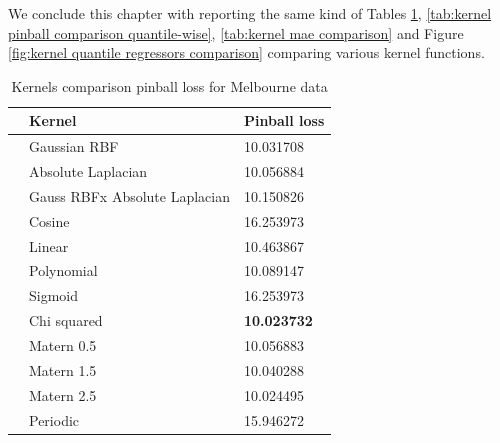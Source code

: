 We conclude this chapter with reporting the same kind of Tables \ref{tab:kernel pinball comparison}, \ref{tab:kernel pinball comparison quantile-wise}, \ref{tab:kernel mae comparison} and Figure \ref{fig:kernel quantile regressors comparison} comparing various kernel functions.

\begin{table}[!h]
    \caption{Kernels comparison pinball loss for Melbourne data}
    \label{tab:kernel pinball comparison}
    \begin{center}
    \begin{tabular}{lll}
        \toprule
        & Kernel & Pinball loss
        \\
        \midrule
        & Gaussian RBF &  10.031708 \\
        & Absolute Laplacian &  10.056884 \\
        & Gauss RBFx Absolute Laplacian & 10.150826 \\
        & Cosine & 16.253973    \\
        & Linear & 10.463867    \\
        & Polynomial & 10.089147     \\
        & Sigmoid & 16.253973            \\
        & Chi squared & \textbf{10.023732}       \\
        & Matern 0.5 & 10.056883  \\
        & Matern 1.5 & 10.040288  \\
        & Matern 2.5 & 10.024495    \\
        & Periodic  & 15.946272\\
        \bottomrule
        \end{tabular}
    \end{center}
    \end{table}
    
